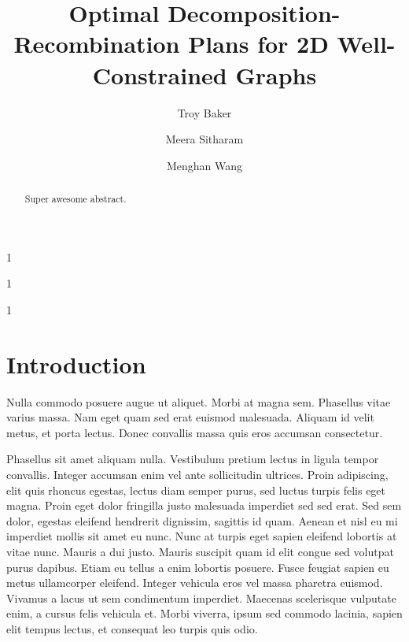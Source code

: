 \documentclass[submission]{gmp2015}
\begin{document}
%
%
\title{Optimal Decomposition-Recombination Plans for 2D Well-Constrained Graphs}

%
%

%
%
\author{Troy Baker}{1}
\author{Meera Sitharam}{1}
\author{Menghan Wang}{1}

%
%

%
%


\maketitle

\begin{abstract}
Super awesome abstract.
\end{abstract}


\section{Introduction}

Nulla commodo posuere augue ut aliquet. Morbi at magna sem. Phasellus vitae varius massa. Nam eget quam sed erat euismod malesuada. Aliquam id velit metus, et porta lectus. Donec convallis massa quis eros accumsan consectetur.

Phasellus sit amet aliquam nulla. Vestibulum pretium lectus in ligula tempor convallis. Integer accumsan enim vel ante sollicitudin ultrices. Proin adipiscing, elit quis rhoncus egestas, lectus diam semper purus, sed luctus turpis felis eget magna. Proin eget dolor fringilla justo malesuada imperdiet sed sed erat. Sed sem dolor, egestas eleifend hendrerit dignissim, sagittis id quam. Aenean et nisl eu mi imperdiet mollis sit amet eu nunc. Nunc at turpis eget sapien eleifend lobortis at vitae nunc. Mauris a dui justo. Mauris suscipit quam id elit congue sed volutpat purus dapibus. Etiam eu tellus a enim lobortis posuere. Fusce feugiat sapien eu metus ullamcorper eleifend. Integer vehicula eros vel massa pharetra euismod. Vivamus a lacus ut sem condimentum imperdiet. Maecenas scelerisque vulputate enim, a cursus felis vehicula et. Morbi viverra, ipsum sed commodo lacinia, sapien elit tempus lectus, et consequat leo turpis quis odio.
\end{document}
